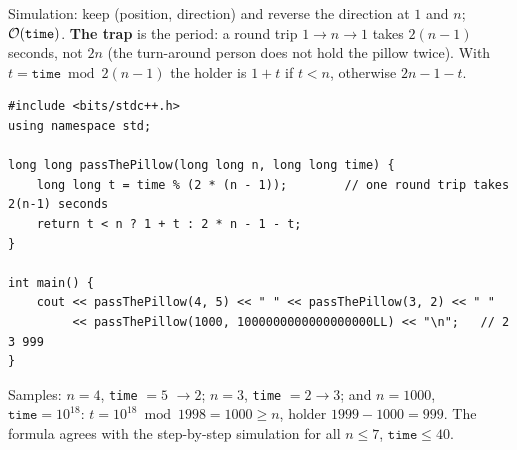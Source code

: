 \begin{solutionbox}
Simulation: keep (position, direction) and reverse the direction at $1$ and $n$; $\mathcal{O}(\texttt{time})$. \textbf{The trap} is the period: a round trip $1 \to n \to 1$ takes $2(n-1)$ seconds, not $2n$ (the turn-around person does not hold the pillow twice). With $t = \texttt{time} \bmod 2(n-1)$ the holder is $1 + t$ if $t < n$, otherwise $2n - 1 - t$.
\begin{center}
\end{center}
\begin{lstlisting}[style=cpp]
#include <bits/stdc++.h>
using namespace std;

long long passThePillow(long long n, long long time) {
    long long t = time % (2 * (n - 1));        // one round trip takes 2(n-1) seconds
    return t < n ? 1 + t : 2 * n - 1 - t;
}

int main() {
    cout << passThePillow(4, 5) << " " << passThePillow(3, 2) << " "
         << passThePillow(1000, 1000000000000000000LL) << "\n";   // 2 3 999
}
\end{lstlisting}
Samples: $n = 4$, \texttt{time} $= 5$ $\to 2$; $n = 3$, \texttt{time} $= 2 \to 3$; and $n = 1000$, $\texttt{time} = 10^{18}$: $t = 10^{18} \bmod 1998 = 1000 \ge n$, holder $1999 - 1000 = 999$. The formula agrees with the step-by-step simulation for all $n \le 7$, $\texttt{time} \le 40$.
\end{solutionbox}
